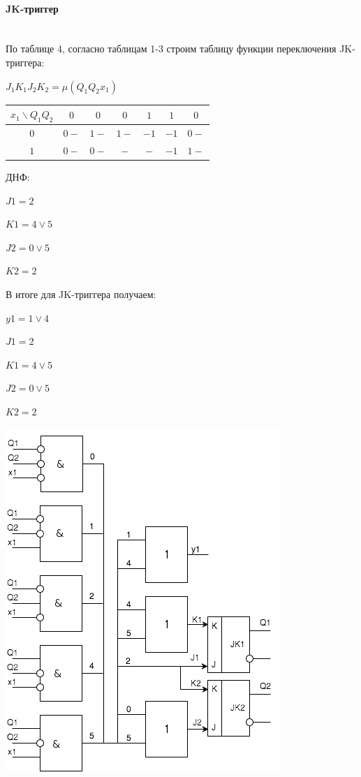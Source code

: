 \paragraph{JK-триггер}\mbox{}\\

По таблице 4, согласно таблицам 1-3 строим таблицу функции
переключения JK-триггера:

$J_1K_1J_2K_2 = \mu(Q_1Q_2x_1)$

\begin{table}[!h]
\begin{tabular}{|c|c|c|c|c|c|c|}
\hline
$x_1 \backslash Q_1Q_2$ & $0$ & $0$ & $0$ & $1$ & $1$ & $0$ \\ \hline
$0$          & $0-$ & $1-$ & $1-$ & $-1$ & $-1$ & $0-$ \\ \hline
$1$          & $0-$ & $0-$ & $- $ & $- $ & $-1$ & $1-$  \\ \hline
\end{tabular}
\end{table}

ДНФ:

$J1 = 2$

$K1 = 4 \vee 5$

$J2 = 0 \vee 5$

$K2 = 2$

В итоге для JK-триггера получаем:

$y1 = 1 \vee 4$

$J1 = 2$

$K1 = 4 \vee 5$

$J2 = 0 \vee 5$

$K2 = 2$

\includegraphics{img/jk.png}

